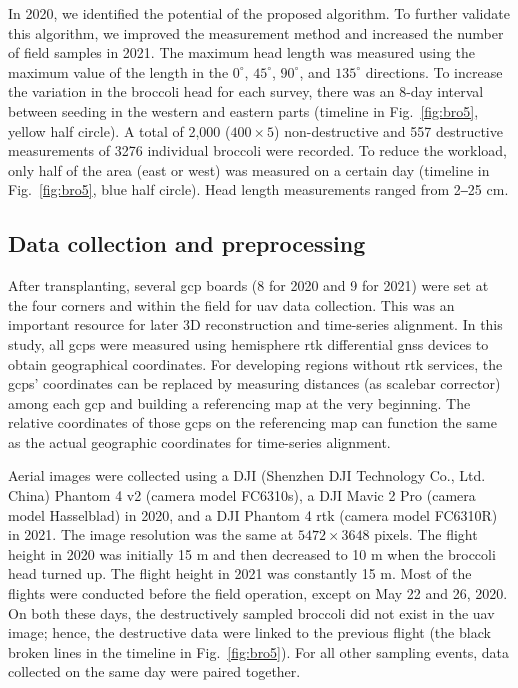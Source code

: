 In 2020, we identified the potential of the proposed algorithm. To further validate this algorithm, we improved the measurement method and increased the number of field samples in 2021. The maximum head length was measured using the maximum value of the length in the $0^\circ$, $45^\circ$, $90^\circ$, and $135^\circ$ directions. To increase the variation in the broccoli head for each survey, there was an 8-day interval between seeding in the western and eastern parts (timeline in Fig.~\ref{fig:bro5}, yellow half circle). A total of 2,000 ($400 \times 5$) non-destructive and 557 destructive measurements of 3276 individual broccoli were recorded. To reduce the workload, only half of the area (east or west) was measured on a certain day (timeline in Fig.~\ref{fig:bro5}, blue half circle). Head length measurements ranged from 2‒25 cm.

\subsection{Data collection and preprocessing}

After transplanting, several \gls{gcp} boards (8 for 2020 and 9 for 2021) were set at the four corners and within the field for \gls{uav} data collection. This was an important resource for later 3D reconstruction and time-series alignment. In this study, all \gls{gcp}s were measured using hemisphere \gls{rtk} differential \gls{gnss} devices to obtain geographical coordinates. For developing regions without \gls{rtk} services, the \gls{gcp}s' coordinates can be replaced by measuring distances (as scalebar corrector) among each \gls{gcp} and building a referencing map at the very beginning. The relative coordinates of those \gls{gcp}s on the referencing map can function the same as the actual geographic coordinates for time-series alignment.

Aerial images were collected using a DJI (Shenzhen DJI Technology Co., Ltd. China) Phantom 4 v2 (camera model FC6310s), a DJI Mavic 2 Pro (camera model Hasselblad) in 2020, and a DJI Phantom 4 \gls{rtk} (camera model FC6310R) in 2021. The image resolution was the same at $5472 \times 3648$ pixels. The flight height in 2020 was initially 15 m and then decreased to 10 m when the broccoli head turned up. The flight height in 2021 was constantly 15 m. Most of the flights were conducted before the field operation, except on May 22 and 26, 2020. On both these days, the destructively sampled broccoli did not exist in the \gls{uav} image; hence, the destructive data were linked to the previous flight (the black broken lines in the timeline in Fig.~\ref{fig:bro5}). For all other sampling events, data collected on the same day were paired together.

